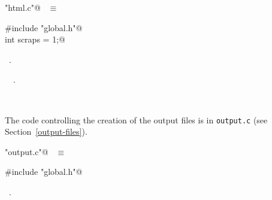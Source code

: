 \documentclass{report}
\begin{document}
\begin{flushleft} \small
\begin{minipage}{\linewidth} \label{scrap7}
\verb@"html.c"@\nobreak\ {\footnotesize {} }$\equiv$
\vspace{-1ex}
\begin{list}{}{} \item
\mbox{}\verb@#include "global.h"@\\
\mbox{}\verb@static int scraps = 1;@\\
\mbox{}\verb@@{\NWsep}
\end{list}
\vspace{-1ex}
\footnotesize\addtolength{\baselineskip}{-1ex}
\begin{list}{}{\setlength{\itemsep}{-\parsep}\setlength{\itemindent}{-\leftmargin}}
\item \NWtxtFileDefBy\ .
\end{list}
\vspace{-2ex}
\footnotesize\addtolength{\baselineskip}{-1ex}
\begin{list}{}{\setlength{\itemsep}{-\parsep}\setlength{\itemindent}{-\leftmargin}}
\item \NWtxtIdentsUsed\nobreak\  \verb@scraps@\nobreak\ .\end{list}
\end{minipage}\\[4ex]
\end{flushleft}
The code controlling the creation of the output files is in \verb|output.c|
(see Section~\ref{output-files}).
\begin{flushleft} \small
\begin{minipage}{\linewidth} \label{scrap8}
\verb@"output.c"@\nobreak\ {\footnotesize {} }$\equiv$
\vspace{-1ex}
\begin{list}{}{} \item
\mbox{}\verb@#include "global.h"@\\
\mbox{}\verb@@{\NWsep}
\end{list}
\vspace{-1ex}
\footnotesize\addtolength{\baselineskip}{-1ex}
\begin{list}{}{\setlength{\itemsep}{-\parsep}\setlength{\itemindent}{-\leftmargin}}
\item \NWtxtFileDefBy\ .
\end{list}
\end{minipage}\\[4ex]
\end{flushleft}
\newpage
\end{document}
